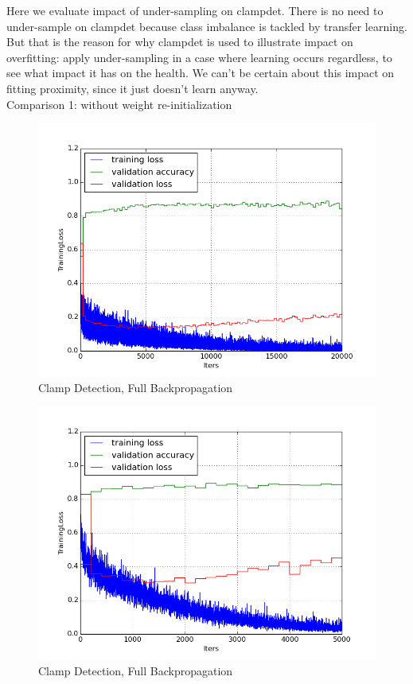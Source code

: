 \documentclass[a4paper,11pt]{article}
\begin{document}
Here we evaluate impact of under-sampling on clampdet. There is no need to under-sample on clampdet because class imbalance is tackled by transfer learning. But that is the reason for why clampdet is used to illustrate impact on overfitting: apply under-sampling in a case where learning occurs regardless, to see what impact it has on the health. We can't be certain about this impact on fitting proximity, since it just doesn't learn anyway. \\

Comparison 1: without weight re-initialization

\begin{figure}[h!]
	\centering
	\includegraphics[scale=0.5]{images/plot_clampdet_none.png}
	\caption{Clamp Detection, Full Backpropagation}
\end{figure}

\begin{figure}[h!]
	\centering
	\includegraphics[scale=0.5]{images/plot_clampdet_us_none.png}
	\caption{Clamp Detection, Full Backpropagation}
\end{figure}
\end{document}
